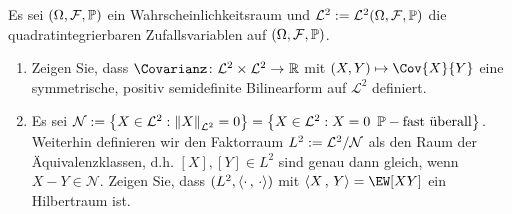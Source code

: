 \begin{exercisePage}
	\begin{homework}
		Es sei $(\Omega, \mathcal{F}, \mathbb{P})$ ein Wahrscheinlichkeitsraum und $\mathcal{L}^2 \mathrel{:=} \mathcal{L}^2(\Omega, \mathcal{F}, \mathbb{P})$ die quadratintegrierbaren Zufallsvariablen auf $(\Omega, \mathcal{F}, \mathbb{P})$.
		\begin{enumerate}[leftmargin=*, nolistsep]
			\item Zeigen Sie, dass $\abb{\Covarianz}{\mathcal{L}^2 \times \mathcal{L}^2}{\R}$ mit $(X,Y) \mapsto \Cov{X}{Y}$ eine symmetrische, positiv semidefinite Bilinearform auf $\mathcal{L}^2$ definiert.
			\item Es sei $\mathcal{N} \mathrel{:=} \left\{ X \in \mathcal{L}^2 : \left\lVert X \right\rVert_{\mathcal{L}^2} = 0 \right\} = \left\{ X \in \mathcal{L}^2 : X = 0 \enskip \mathbb{P}-\text{fast überall} \right\}$. Weiterhin definieren wir den Faktorraum $L^2 \mathrel{:=} \mathcal{L}^2 / \mathcal{N}$ als den Raum der Äquivalenzklassen, d.h. $[X], [Y] \in L^2$ sind genau dann gleich, wenn $X-Y \in \mathcal{N}$. Zeigen Sie, dass $(L^2, \langle \cdot\, ,\, \cdot \rangle)$ mit $\scal{X}{Y} = \EW[XY]$ ein Hilbertraum ist.
		\end{enumerate}
	\end{homework}


\end{exercisePage}
